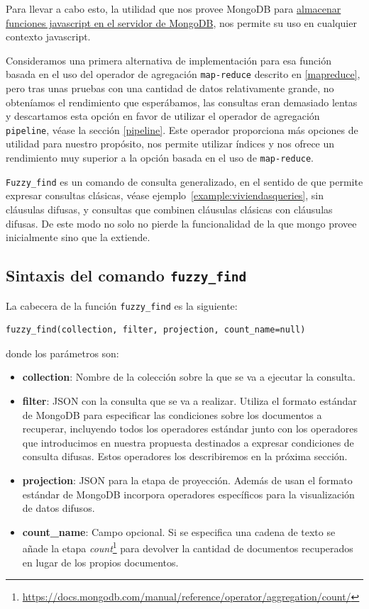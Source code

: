 Para llevar a cabo esto, la utilidad que nos provee MongoDB para \href{https://docs.mongodb.com/manual/tutorial/store-javascript-function-on-server/}{almacenar funciones javascript en el servidor de MongoDB}, nos permite su uso en cualquier contexto javascript.

Consideramos una primera alternativa de implementación para esa función basada en el uso del operador de agregación \texttt{map-reduce} descrito en \ref{mapreduce}, pero tras unas pruebas con una cantidad de datos relativamente grande, no obteníamos el rendimiento que esperábamos, las consultas eran demasiado lentas y descartamos esta opción en favor de utilizar el operador de agregación \texttt{pipeline}, véase la sección \ref{pipeline}. Este operador proporciona más opciones de utilidad para nuestro propósito, nos permite utilizar índices y nos ofrece un rendimiento muy superior a la opción basada en el uso de \texttt{map-reduce}.

\texttt{Fuzzy\_find} es un comando de consulta generalizado, en el sentido de que permite expresar consultas clásicas, véase ejemplo~\ref{example:viviendasqueries}, sin cláusulas difusas, y consultas que combinen cláusulas clásicas con cláusulas difusas. De este modo no solo no pierde la funcionalidad de la que mongo provee inicialmente sino que la extiende.

\subsection{Sintaxis del comando \texttt{fuzzy\_find}}

La cabecera de la función \texttt{fuzzy\_find} es la siguiente:

\begin{verbatim}
fuzzy_find(collection, filter, projection, count_name=null)
\end{verbatim}
%
donde los parámetros son:

\begin{itemize}
    \item \textbf{collection}: Nombre de la colección sobre la que se va a ejecutar la consulta.
    \item \textbf{filter}: JSON con la consulta que se va a realizar. Utiliza el formato estándar de MongoDB para especificar las condiciones sobre los documentos a recuperar, incluyendo todos los operadores estándar junto con los operadores que introducimos en nuestra propuesta destinados a expresar condiciones de consulta difusas. Estos operadores los describiremos en la próxima sección.
    \item \textbf{projection}: JSON para la etapa de proyección. Además de usan el formato estándar de MongoDB incorpora operadores específicos para la visualización de datos difusos.
    \item \textbf{count\_name}: Campo opcional. Si se especifica una cadena de texto se añade la etapa \textit{count}\footnote{\url{https://docs.mongodb.com/manual/reference/operator/aggregation/count/}} para devolver la cantidad de documentos recuperados en lugar de los propios documentos.
\end{itemize}

